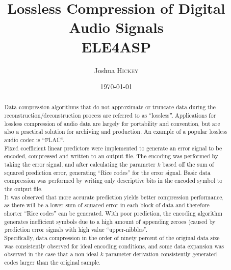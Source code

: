 \documentclass{article}
\title{Lossless Compression of Digital Audio Signals \\ ELE4ASP} %
\author{Joshua \textsc{Hickey}} %
\date{\today} %
\begin{document}
\maketitle %



\begin{abstract}

Data compression algorithms that do not approximate or truncate data during the reconstruction/deconstruction process are referred to as ``lossless''. Applications for lossless compression of audio data are largely for portability and convention, but are also a practical solution for archiving and production. An example of a popular lossless audio codec is ``FLAC''.\\

Fixed coefficient linear predictors were implemented to generate an error signal to be encoded, compressed and written to an output file. The encoding was performed by taking the error signal, and after calculating the parameter $k$ based off the sum of squared prediction error, generating ``Rice codes'' for the error signal. Basic data compression was performed by writing only descriptive bits in the encoded symbol to the output file.\\

It was observed that more accurate prediction yields better compression performance, as there will be a lower sum of squared error in each block of data and therefore shorter ``Rice codes'' can be generated. With poor prediction, the encoding algorithm generates inefficient symbols due to a high amount of appending zeroes (caused by prediction error signals with high value ``upper-nibbles''. \\

Specifically, data compression in the order of ninety percent of the original data size was consistently observed for ideal encoding conditions, and some data expansion was observed in the case that a non ideal $k$ parameter derivation consistently generated codes larger than the original sample. \\ 

\end{abstract}

\end{document}
